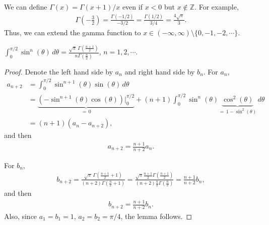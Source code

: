 \medskip

\begin{remark}
We can define $\Gamma(x) = \Gamma(x+1) / x$ even if $x < 0$ but $x \notin \mathbb{Z}$. For example, 
\begin{align*}
    \Gamma\left(-\frac{3}{2}\right) = \frac{\Gamma\left(-1/2\right)}{-3/2} = \frac{\Gamma\left(1/2\right)}{3/4} = \frac{4\sqrt{\pi}}{3}.
\end{align*}
Thus, we can extend the gamma function to $x \in (-\infty, \infty) \setminus \{0, -1, -2, \cdots\}$.
\end{remark}

\medskip

\begin{lemma}
$\displaystyle \int^{\pi/2}_0 \sin^n(\theta)\, d\theta = \frac{\sqrt{\pi} \, \Gamma\left(\frac{n+1}{2}\right)}{n \Gamma\left(\frac{n}{2}\right)}$, $n = 1,2,\cdots$.
\end{lemma}
\begin{proof}
Denote the left hand side by $a_n$ and right hand side by $b_n$. For $a_n$,
\begin{align*}
    a_{n+2} & = \int^{\pi/2}_0 \sin^{n+1}(\theta) \sin (\theta)\, d\theta \\
    & = \underbrace{\left( - \sin^{n+1}(\theta) \cos(\theta) \right)\Big|^{\pi/2}_0}_{=\, 0} + (n+1) \int^{\pi/2}_0 \sin^n(\theta) \underbrace{\cos^2(\theta)}_{=\, 1 - \sin^2(\theta)}\, d\theta \\
    & = (n+1)(a_n - a_{n+2}),
\end{align*}
and then
\begin{align*}
    a_{n+2} = \frac{n+1}{n+2}a_n.
\end{align*}

For $b_n$,
\begin{align*}
    b_{n+2} = \frac{\sqrt{\pi} \, \Gamma\left(\frac{n+1}{2} + 1\right)}{(n+2) \Gamma\left(\frac{n}{2} + 1\right)} = \frac{\sqrt{\pi} \frac{n+1}{2} \Gamma\left(\frac{n+1}{2}\right)}{(n+2) \frac{n}{2} \Gamma\left(\frac{n}{2}\right)} = \frac{n+1}{n+2} b_n,
\end{align*}
and then
\begin{align*}
    b_{n+2} = \frac{n+1}{n+2}b_n.
\end{align*}
Also, since $a_1 = b_1 = 1$, $a_2 = b_2 = \pi/4$, the lemma follows.
\end{proof}

\medskip


